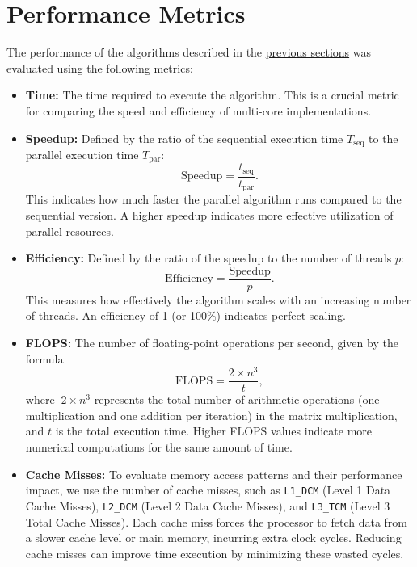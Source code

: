 \section{Performance Metrics}  \label{section:performance}
  The performance of the algorithms described in the \hyperref[section:algorithms]{previous sections} was evaluated using the following metrics:

\begin{itemize}
  \item \textbf{Time:} The time required to execute the algorithm. This is a crucial metric for comparing the speed and efficiency of multi-core implementations.

  \item \textbf{Speedup:} Defined by the ratio of the sequential execution time $T_{\text{seq}}$ to the parallel execution time $T_{\text{par}}$:
  \[
    \text{Speedup} = \frac{t_{\text{seq}}}{t_{\text{par}}}.
  \]
  This indicates how much faster the parallel algorithm runs compared to the sequential version. A higher speedup indicates more effective utilization of parallel resources.

  \item \textbf{Efficiency:} Defined by the ratio of the speedup to the number of threads $p$:
  \[
    \text{Efficiency} = \frac{\text{Speedup}}{p}.
  \]
  This measures how effectively the algorithm scales with an increasing number of threads. An efficiency of 1 (or 100\%) indicates perfect scaling.

  \item \textbf{FLOPS:} The number of floating-point operations per second, given by the formula
  \[
    \text{FLOPS} = \frac{2 \times n^3}{t},
  \]
  where \(\ 2 \times n^3\) represents the total number of arithmetic operations (one multiplication and one addition per iteration) in the matrix multiplication, and $t$ is the total execution time. Higher FLOPS values indicate more numerical computations for the same amount of time.

  \item \textbf{Cache Misses:} To evaluate memory access patterns and their performance impact, we use the number of cache misses, such as \verb#L1_DCM# (Level 1 Data Cache Misses), \verb#L2_DCM# (Level 2 Data Cache Misses), and \verb#L3_TCM# (Level 3 Total Cache Misses). Each cache miss forces the processor to fetch data from a slower cache level or main memory, incurring extra clock cycles. Reducing cache misses can improve time execution by minimizing these wasted cycles.
\end{itemize}
